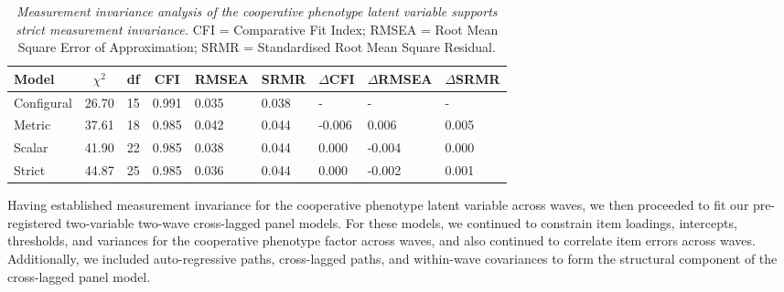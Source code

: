 \documentclass[
  man,floatsintext]{apa6}
\begin{document}
\begin{table}[tbp]

\begin{center}
\begin{threeparttable}

\caption{\label{tab:tableCompareMI}\emph{Measurement invariance analysis of the cooperative phenotype latent variable supports strict measurement invariance.} CFI = Comparative Fit Index; RMSEA = Root Mean Square Error of Approximation; SRMR = Standardised Root Mean Square Residual.}

\begin{tabular}{lllllllll}
\toprule
Model & \multicolumn{1}{c}{$\chi^2$} & \multicolumn{1}{c}{df} & \multicolumn{1}{c}{CFI} & \multicolumn{1}{c}{RMSEA} & \multicolumn{1}{c}{SRMR} & \multicolumn{1}{c}{$\Delta$CFI} & \multicolumn{1}{c}{$\Delta$RMSEA} & \multicolumn{1}{c}{$\Delta$SRMR}\\
\midrule
Configural & 26.70 & 15 & 0.991 & 0.035 & 0.038 & - & - & -\\
Metric & 37.61 & 18 & 0.985 & 0.042 & 0.044 & -0.006 & 0.006 & 0.005\\
Scalar & 41.90 & 22 & 0.985 & 0.038 & 0.044 & 0.000 & -0.004 & 0.000\\
Strict & 44.87 & 25 & 0.985 & 0.036 & 0.044 & 0.000 & -0.002 & 0.001\\
\bottomrule
\end{tabular}

\end{threeparttable}
\end{center}

\end{table}

Having established measurement invariance for the cooperative phenotype latent variable across waves, we then proceeded to fit our pre-registered two-variable two-wave cross-lagged panel models. For these models, we continued to constrain item loadings, intercepts, thresholds, and variances for the cooperative phenotype factor across waves, and also continued to correlate item errors across waves. Additionally, we included auto-regressive paths, cross-lagged paths, and within-wave covariances to form the structural component of the cross-lagged panel model.
\end{document}
